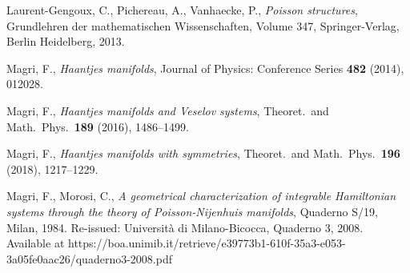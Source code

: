 \documentclass[12pt]{article}
\begin{document}
 Laurent-Gengoux, C., Pichereau, A., Vanhaecke, P., {\it Poisson structures}, Grundlehren der mathematischen Wissenschaften, Volume 347, Springer-Verlag, Berlin Heidelberg, 2013.



 Magri, F., {\it Haantjes manifolds}, Journal of Physics: Conference Series {\bf 482} (2014), 012028.

 Magri, F., {\it Haantjes manifolds and Veselov systems}, Theoret.\ and Math.\ Phys.\ {\bf 189} (2016), 1486--1499.

 Magri, F., {\it  Haantjes manifolds with symmetries}, Theoret.\ and Math.\ Phys.\ {\bf 196} (2018), 1217--1229.

 Magri, F., Morosi, C., {\it A geometrical characterization of integrable Hamiltonian systems through the theory of Poisson-Nijenhuis manifolds}, Quaderno S/19, Milan, 1984. Re-issued: Universit\`a di Milano-Bicocca, Quaderno 3, 2008.
Available at https://boa.unimib.it/retrieve/e39773b1-610f-35a3-e053-3a05fe0aac26/quaderno3-2008.pdf





\end{document}
